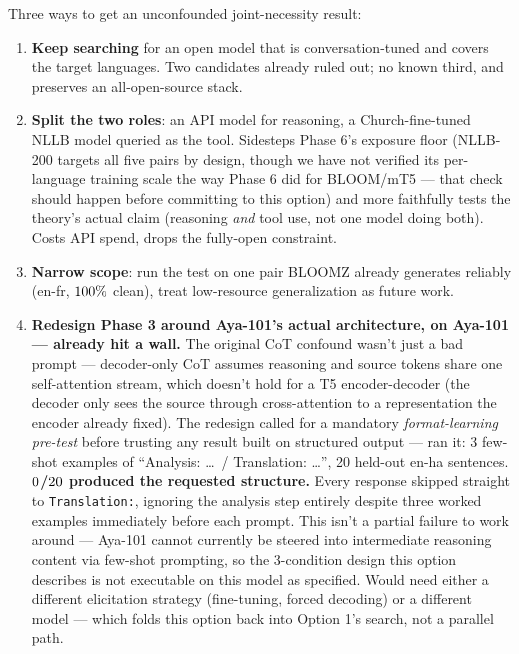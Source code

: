 \documentclass[11pt]{article}
\begin{document}
Three ways to get an unconfounded joint-necessity result:
\begin{enumerate}
  \item \textbf{Keep searching} for an open model that is conversation-tuned and covers the
    target languages. Two candidates already ruled out; no known third, and preserves an
    all-open-source stack.
  \item \textbf{Split the two roles}: an API model for reasoning, a Church-fine-tuned NLLB
    model queried as the tool. Sidesteps Phase 6's exposure floor (NLLB-200 targets all five pairs by design, though
    we have not verified its per-language training scale the way Phase 6 did for BLOOM/mT5 ---
    that check should happen before committing to this option) and more faithfully tests the
    theory's actual claim
    (reasoning \emph{and} tool use, not one model doing both). Costs API spend, drops the
    fully-open constraint.
  \item \textbf{Narrow scope}: run the test on one pair BLOOMZ already generates reliably
    (en-fr, $100\%$ clean), treat low-resource generalization as future
    work.
  \item \textbf{Redesign Phase 3 around Aya-101's actual architecture, on Aya-101 --- already
    hit a wall.} The original CoT confound wasn't just a bad prompt --- decoder-only CoT
    assumes reasoning and source tokens share one self-attention stream, which doesn't hold
    for a T5 encoder-decoder (the decoder only sees the source through cross-attention to a
    representation the encoder already fixed). The redesign called for a mandatory
    \emph{format-learning pre-test} before trusting any result built on structured output ---
    ran it: 3 few-shot examples of ``Analysis: \ldots\ / Translation: \ldots'', 20 held-out
    en-ha sentences. \textbf{$0$/$20$
    produced the requested structure.} Every response skipped straight to \texttt{Translation:},
    ignoring the analysis step entirely despite three worked examples immediately before each
    prompt. This isn't a partial failure to work around --- Aya-101 cannot currently be steered
    into intermediate reasoning content via few-shot prompting, so the 3-condition design this
    option describes is not executable on this model as specified. Would need either a
    different elicitation strategy (fine-tuning, forced decoding) or a different model ---
    which folds this option back into Option 1's search, not a parallel path.
\end{enumerate}
\end{document}
